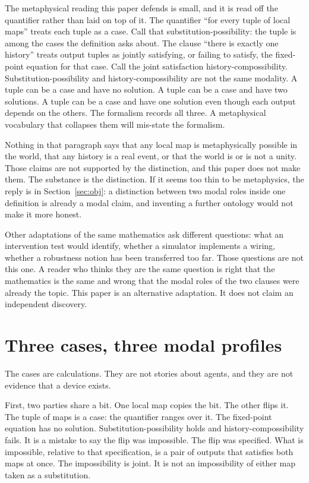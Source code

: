 \documentclass[11pt]{article}
\begin{document}
The metaphysical reading this paper defends is small, and it is read off the quantifier rather than laid on top of it. The quantifier ``for every tuple of local maps'' treats each tuple as a case. Call that substitution-possibility: the tuple is among the cases the definition asks about. The clause ``there is exactly one history'' treats output tuples as jointly satisfying, or failing to satisfy, the fixed-point equation for that case. Call the joint satisfaction history-compossibility. Substitution-possibility and history-compossibility are not the same modality. A tuple can be a case and have no solution. A tuple can be a case and have two solutions. A tuple can be a case and have one solution even though each output depends on the others. The formalism records all three. A metaphysical vocabulary that collapses them will mis-state the formalism.

Nothing in that paragraph says that any local map is metaphysically possible in the world, that any history is a real event, or that the world is or is not a unity. Those claims are not supported by the distinction, and this paper does not make them. The substance is the distinction. If it seems too thin to be metaphysics, the reply is in Section~\ref{sec:obj}: a distinction between two modal roles inside one definition is already a modal claim, and inventing a further ontology would not make it more honest.

Other adaptations of the same mathematics ask different questions: what an intervention test would identify, whether a simulator implements a wiring, whether a robustness notion has been transferred too far. Those questions are not this one. A reader who thinks they are the same question is right that the mathematics is the same and wrong that the modal roles of the two clauses were already the topic. This paper is an alternative adaptation. It does not claim an independent discovery.

\section{Three cases, three modal profiles}
\label{sec:cases}

The cases are calculations. They are not stories about agents, and they are not evidence that a device exists.

First, two parties share a bit. One local map copies the bit. The other flips it. The tuple of maps is a case: the quantifier ranges over it. The fixed-point equation has no solution. Substitution-possibility holds and history-compossibility fails. It is a mistake to say the flip was impossible. The flip was specified. What is impossible, relative to that specification, is a pair of outputs that satisfies both maps at once. The impossibility is joint. It is not an impossibility of either map taken as a substitution.
\end{document}
